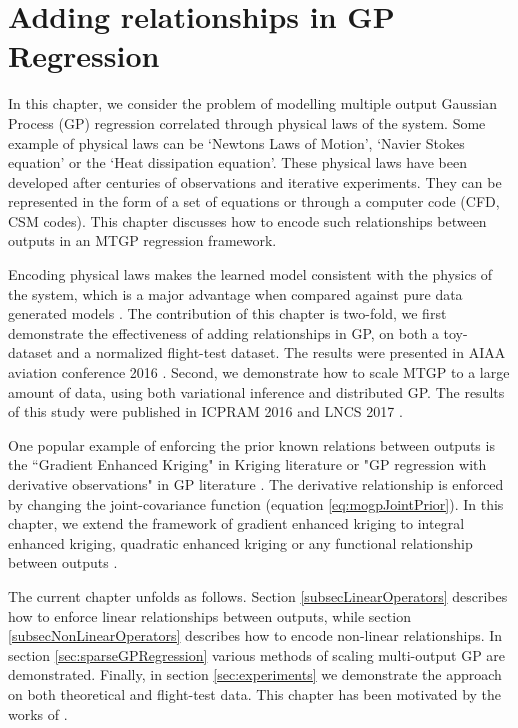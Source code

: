 \chapter{Adding relationships in GP Regression}
\label{chapAddingEquationsInGP}
In this chapter, we consider the problem of modelling multiple output Gaussian Process (GP) regression correlated through physical laws of the system. Some example of physical laws can be `Newtons Laws of Motion', `Navier Stokes equation' or the `Heat dissipation equation'. These physical laws have been developed after centuries of observations and iterative experiments. They can be represented in the form of a set of equations or through a computer code (CFD, CSM codes). This chapter discusses how to encode such relationships between outputs in an MTGP regression framework. 

Encoding physical laws makes the learned model consistent with the physics of the system, which is a major advantage when compared against pure data generated models \cite{jazwinski2007stochastic}. The contribution of this chapter is two-fold, we first demonstrate the effectiveness of adding relationships in GP, on both a toy-dataset and a normalized flight-test dataset. The results were presented in AIAA aviation conference 2016 \cite{oatao18001}. Second, we demonstrate how to scale MTGP to a large amount of data, using both variational inference and distributed GP. The results of this study were published in ICPRAM 2016 and LNCS 2017 \cite{icpram16Ankit, oatao18000}.

One popular example of enforcing the prior known relations between outputs is the ``Gradient Enhanced Kriging" in Kriging literature \cite{chung2002using, morris1993bayesian, forrester2009recent} or "GP regression with derivative observations" in GP literature \cite{NIPSDerivativeGP}. The derivative relationship is enforced by changing the joint-covariance function (equation \ref{eq:mogpJointPrior}). In this chapter, we extend the framework of gradient enhanced kriging to integral enhanced kriging, quadratic enhanced kriging or any functional relationship between outputs \cite{Constantinescu2013}.  

The current chapter unfolds as follows. Section \ref{subsecLinearOperators} describes how to enforce linear relationships between outputs, while section \ref{subsecNonLinearOperators} describes how to encode non-linear relationships. In section \ref{sec:sparseGPRegression} various methods of scaling multi-output GP are demonstrated. Finally, in section \ref{sec:experiments} we demonstrate the approach on both theoretical and flight-test data. This chapter has been motivated by the works of \cite{Constantinescu2013, journals/jmlr/AlvarezLL09, sarkka2011linear, jidling2017linearly, ginsbourger2013invariances, sarkka2011linear}.

